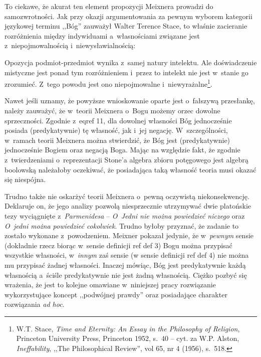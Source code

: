 To ciekawe, że akurat ten element propozycji Meixnera prowadzi do samozwrotności. Jak przy okazji argumentowania za pewnym wyborem kategorii językowej terminu ,,Bóg'' zauważył Walter Terence Stace, to właśnie zacieranie rozróżnienia między indywiduami a~własnościami związane jest z~niepojmowalnością i~niewysławialnością:

Opozycja podmiot-przedmiot wynika z~samej natury intelektu. Ale doświadczenie mistyczne jest ponad tym rozróżnieniem i~przez to intelekt nie jest w~stanie go zrozumieć. Z~tego powodu jest ono niepojmowalne i~niewyrażalne\footnote{W.T. Stace, \textit{Time and Eternity: An Essay in the Philosophy of Religion}, Princeton University Press, Princeton 1952, s.~40 -- cyt. za W.P. Alston, \textit{Ineffability}, ,,The Philosophical Review'', vol 65, nr 4 (1956), s.~518.}.

Nawet jeśli uznamy, że powyższe wnioskowanie oparte jest o~fałszywą przesłankę, należy zauważyć, że w~teorii Meixnera o~Bogu możemy orzec dowolne sprzeczności. Zgodnie z~eqref 11, dla dowolnej własności Bóg jednocześnie posiada (predykatywnie) tę własność, jak i~jej negację. W~szczególności, w~ramach teorii Meixnera można stwierdzić, że Bóg jest (predykatywnie) jednocześnie Bogiem oraz negacją Boga. Mając na względzie fakt, że zgodnie z~twierdzeniami o~reprezentacji Stone'a algebra zbioru potęgowego jest algebrą boolowską należałoby oczekiwać, że posiadająca taką własność teoria musi okazać się niespójna.

Trudno także nie oskarżyć teorii Meixnera o~pewną oczywistą niekonsekwencję. Deklaruje on, że jego analizy pozwolą niesprzecznie utrzymywać dwie platońskie tezy wyciągnięte z~\textit{Parmenidesa} -- \textit{O~Jedni nie można powiedzieć niczego} oraz \textit{O~jedni można powiedzieć cokolwiek}. Trudno byłoby przyznać, że zadanie to zostało wykonane z~powodzeniem. Meixner pokazał jedynie, że w~\textit{pewnym} sensie (dokładnie rzecz biorąc w~sensie definicji ref def 3) Bogu można przypisać wszystkie własności, w~\textit{innym} zaś sensie (w sensie definicji ref def 4) nie można mu przypisać żadnej własności. Inaczej mówiąc, Bóg jest predykatywnie każdą własnością a~ściśle predykatywnie nie jest żadną własnością. Ciężko pozbyć się wrażenia, że jest to kolejne omawiane w~niniejszej pracy rozwiązanie wykorzystujące koncept ,,podwójnej prawdy'' oraz posiadające charakter rozwiązania \textit{ad hoc}.


